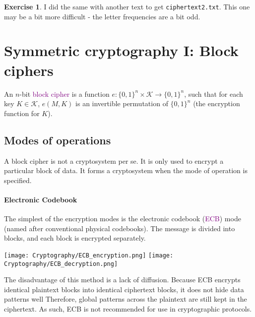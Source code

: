 \documentclass[a4paper, 11pt, openany]{book}
\numberwithin{equation}{section}
\theoremstyle{plain}
\theoremstyle{definition}
\newtheorem{exercise}   {Exercise}  [section]
\newcommand{\Define}[1]{\textcolor{purple}{#1}}
\newcommand{\alphabet}[1]{\mathcal{#1}}
\begin{document}
\begin{exercise} \label{exercise:substitution2}
I did the same with another text to get \texttt{ciphertext2.txt}. This one may be a bit more difficult - the letter frequencies are a bit odd.
\end{exercise}











\section{Symmetric cryptography I: Block ciphers}
\label{sec:12}


An $n$-bit \Define{block cipher} is a function $e : \{0,1\}^n \times \mathcal{K} \to \{0,1\}^n$, such that for each
key $K \in \alphabet{K}$, $e(M,K)$ is an invertible permutation of $\{0,1\}^n$ (the encryption function for $K$).



\subsection{Modes of operations}

A block cipher is not a cryptosystem per se. It is only used to encrypt a particular block of data. It forms a cryptosystem when the mode of operation is specified.

\paragraph{Electronic Codebook} 
The simplest of the encryption modes is the electronic codebook (\Define{ECB}) mode (named after conventional physical codebooks). The message is divided into blocks, and each block is encrypted separately.

\begin{center}
    \texttt{[image: Cryptography/ECB\_encryption.png]}
    \texttt{[image: Cryptography/ECB\_decryption.png]}
\end{center}


The disadvantage of this method is a lack of diffusion. Because ECB encrypts identical plaintext blocks into identical ciphertext blocks, it does not hide data patterns well Therefore, global patterns across the plaintext are still kept in the ciphertext. As such, ECB is not recommended for use in cryptographic protocols.
\end{document}
